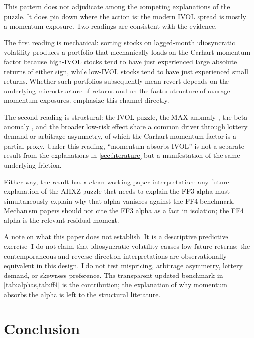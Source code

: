 \documentclass[12pt]{article}
\newcommand{\1}[1]{\mathds{1}\left[#1\right]}
\begin{document}
This pattern does not adjudicate among the competing explanations of the
puzzle. It does pin down where the action is: the modern IVOL spread is
mostly a momentum exposure. Two readings are consistent with the evidence.

The first reading is mechanical: sorting stocks on lagged-month idiosyncratic
volatility produces a portfolio that mechanically loads on the Carhart
momentum factor because high-IVOL stocks tend to have just experienced large
absolute returns of either sign, while low-IVOL stocks tend to have just
experienced small returns. Whether such portfolios subsequently
mean-revert depends on the underlying microstructure of returns and on the
factor structure of average momentum exposures. \citet{huang2010return}
emphasize this channel directly.

The second reading is structural: the IVOL puzzle, the MAX anomaly
\citep{bali2011maxing}, the beta anomaly \citep{liu2018absolving}, and the
broader low-risk effect \citep{asness2020betting} share a common driver
through lottery demand or arbitrage asymmetry, of which the Carhart momentum
factor is a partial proxy. Under this reading, ``momentum absorbs IVOL''
is not a separate result from the explanations in \cref{sec:literature} but
a manifestation of the same underlying friction.

Either way, the result has a clean working-paper interpretation: any future
explanation of the AHXZ puzzle that needs to explain the FF3 alpha must
simultaneously explain why that alpha vanishes against the FF4 benchmark.
Mechanism papers should not cite the FF3 alpha as a fact in isolation; the
FF4 alpha is the relevant residual moment.

A note on what this paper does not establish. It is a descriptive predictive
exercise. I do not claim that idiosyncratic volatility causes low future
returns; the contemporaneous and reverse-direction interpretations are
observationally equivalent in this design. I do not test mispricing,
arbitrage asymmetry, lottery demand, or skewness preference. The transparent
updated benchmark in \cref{tab:alphas,tab:ff4} is the contribution; the
explanation of why momentum absorbs the alpha is left to the structural
literature.

\section{Conclusion}\label{sec:conclusion}
\end{document}
